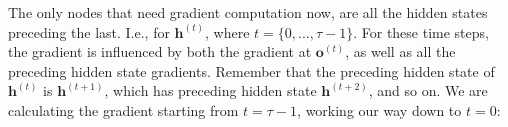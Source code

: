 \documentclass[12pt]{article}
\begin{document}
The only nodes that need gradient computation now, are all the hidden states preceding the last. I.e., for $\mathbf{h}^{(t)}$, where $t = \{0,...,\tau-1\}$. For these time steps, the gradient is influenced by both the gradient at $\mathbf{o}^{(t)}$, as well as all the preceding hidden state gradients. Remember that the preceding hidden state of $\mathbf{h}^{(t)}$ is $\mathbf{h}^{(t+1)}$, which has preceding hidden state $\mathbf{h}^{(t+2)}$, and so on. We are calculating the gradient starting from $t=\tau-1$, working our way down to $t=0$: \par
\end{document}
